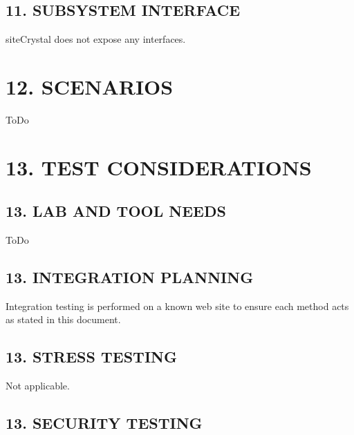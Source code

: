 \hypertarget{index_sec_11_3}{}\subsection{11.	\+S\+U\+B\+S\+Y\+S\+T\+E\+M I\+N\+T\+E\+R\+F\+A\+C\+E}\label{index_sec_11_3}
\begin{DoxyVerb}siteCrystal does not expose any interfaces.
\end{DoxyVerb}
\hypertarget{index_sec_12}{}\section{12.	\+S\+C\+E\+N\+A\+R\+I\+O\+S}\label{index_sec_12}
\begin{DoxyVerb}ToDo
\end{DoxyVerb}
\hypertarget{index_sec_13}{}\section{13.	\+T\+E\+S\+T C\+O\+N\+S\+I\+D\+E\+R\+A\+T\+I\+O\+N\+S}\label{index_sec_13}
\hypertarget{index_sec_13_1}{}\subsection{13.	\+L\+A\+B A\+N\+D T\+O\+O\+L N\+E\+E\+D\+S}\label{index_sec_13_1}
\begin{DoxyVerb}ToDo
\end{DoxyVerb}
\hypertarget{index_sec_13_2}{}\subsection{13.	\+I\+N\+T\+E\+G\+R\+A\+T\+I\+O\+N P\+L\+A\+N\+N\+I\+N\+G}\label{index_sec_13_2}
\begin{DoxyVerb}Integration testing is performed on a known web site to ensure each method acts as stated in this document.
\end{DoxyVerb}
\hypertarget{index_sec_13_3}{}\subsection{13.	\+S\+T\+R\+E\+S\+S T\+E\+S\+T\+I\+N\+G}\label{index_sec_13_3}
\begin{DoxyVerb}Not applicable.
\end{DoxyVerb}
\hypertarget{index_sec_13_4}{}\subsection{13.	\+S\+E\+C\+U\+R\+I\+T\+Y T\+E\+S\+T\+I\+N\+G}\label{index_sec_13_4}
